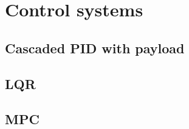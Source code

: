 \graphicspath{{control_systems/fig/}}

\chapter{Control systems}
\label{chap:control_systems}

\section{Cascaded PID with payload}
\section{LQR}
\section{MPC}

